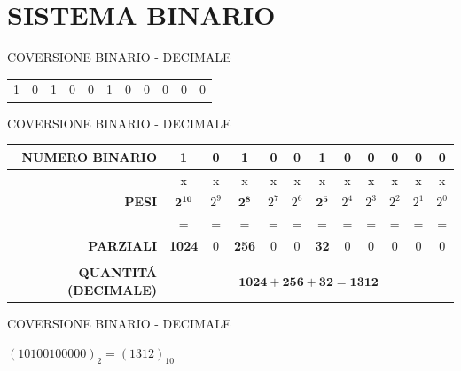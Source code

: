 \documentclass[aspectratio=1610, handout]{beamer}
\begin{document}
\section{SISTEMA BINARIO}

\begin{frame}{COVERSIONE BINARIO - DECIMALE}
    \centering
    \huge
    \begin{tabular}{c c c c c c c c c c c}
        1 & 0 & 1 & 0 & 0 & 1 & 0 & 0 & 0 & 0 & 0 \\
    \end{tabular}
\end{frame}

\begin{frame}{COVERSIONE BINARIO - DECIMALE}
    \centering
    \begin{tabular}{r||c|c|c|c|c|c|c|c|c|c|c}
        \textbf{NUMERO BINARIO} & \textbf{1} & 0 & \textbf{1} & 0 & 0 & \textbf{1} & 0 & 0 & 0 & 0 & 0 \\
        \hline
        \pause
         & x & x & x & x & x & x & x & x & x & x & x \\
        \hline
         \textbf{PESI} & $\mathbf{2^{10}}$ & $2^9$ & $\mathbf{2^8}$ & $2^7$ & $2^6$ & $\mathbf{2^5}$ & $2^4$ & $2^3$ & $2^2$ & $2^1$ & $2^0$ \\
        \hline
         & = & = & = & = & = & = & = & = & = & = & = \\
        \hline
        \pause
        \textbf{PARZIALI} & \textbf{1024} & 0 & \textbf{256} & 0 & 0 & \textbf{32} & 0 & 0 & 0 & 0 & 0 \\
        \\
        \hline
        \pause
        \textbf{QUANTIT\'A (DECIMALE)} & \multicolumn{11}{c}{$\mathbf{1024 + 256 + 32 = 1312}$} \\
    \end{tabular}
    \pause
    \begin{alertblock}{COVERSIONE BINARIO - DECIMALE}
        \begin{minipage}{0.98\linewidth}
            \centering
            \huge
            $(10100100000)_2 = (1312)_{10}$
        \end{minipage}
    \end{alertblock}
\end{frame}
\end{document}
